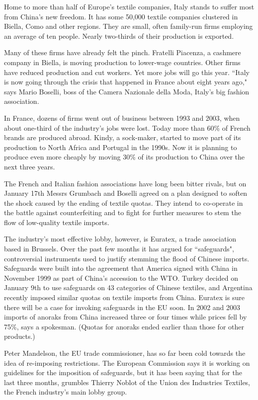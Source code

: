 \documentclass[letterpaper,12pt]{article}
\begin{document}
Home to more than half of Europe's textile companies, Italy stands
to suffer most from China's new freedom. It has some 50,000
textile companies clustered in Biella, Como and other regions.
They are small, often family-run firms employing an average of ten
people. Nearly two-thirds of their production is exported.

Many of these firms have already felt the pinch. Fratelli
Piacenza, a cashmere company in Biella, is moving production to
lower-wage countries. Other firms have reduced production and cut
workers. Yet more jobs will go this year. ``Italy is now going
through the crisis that happened in France about eight years ago,"
says Mario Boselli, boss of the Camera Nazionale della Moda,
Italy's big fashion association.

In France, dozens of firms went out of business between 1993 and
2003, when about one-third of the industry's jobs were lost. Today
more than 60\% of French brands are produced abroad. Kindy, a
sock-maker, started to move part of its production to North Africa
and Portugal in the
1990s. Now it is planning to produce even more cheaply by moving 30\% 
of its production to China over the next three years.

The French and Italian fashion associations have long been bitter
rivals, but on January 17th Messrs Grumbach and Boselli agreed on
a plan designed to soften the shock caused by the ending of
textile quotas. They intend to co-operate in the battle against
counterfeiting and to fight for further measures to stem the flow
of low-quality textile imports.

The industry's most effective lobby, however, is Euratex, a trade
association based in Brussels. Over the past few months it has
argued for ``safeguards", controversial instruments used to justify
stemming the flood of Chinese imports. Safeguards were built into
the agreement that America signed with China in November 1999 as
part of China's accession to the WTO. Turkey decided on January
9th to use safeguards on 43 categories of Chinese textiles, and
Argentina recently imposed similar quotas on textile imports from
China. Euratex is sure there will be a case for invoking
safeguards in the EU soon. In 2002 and 2003 imports of anoraks
from China increased three or four times while prices fell by
75\%, says a spokesman. (Quotas for anoraks ended earlier than
those for other products.)

Peter Mandelson, the EU trade commissioner, has so far been cold
towards the idea of re-imposing restrictions. The European
Commission says it is working on guidelines for the imposition of
safeguards, but it has been saying that for the last three months,
grumbles Thierry Noblot of the Union des Industries Textiles, the
French industry's main lobby group.
\end{document}
